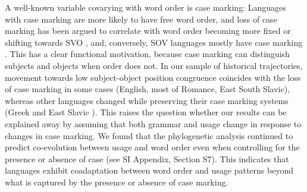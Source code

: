 \documentclass[9pt,twocolumn,twoside,lineno]{pnas-new}
\begin{document}
A well-known variable covarying with word order is case marking: Languages with case marking are more likely to have free word order, and loss of case marking has been argued to correlate with word order becoming more fixed or shifting towards SVO \citep{vennemann1974explanation}, and, conversely, SOV languages mostly have case marking \cite{greenberg-universals-1963}.
This has a clear functional motivation, because case marking can distinguish subjects and objects when order does not.
In our sample of historical trajectories, movement towards low subject-object position congruence coincides with the loss of case marking in some cases (English, most of Romance, East South Slavic), whereas other languages changed while preserving their case marking systems (Greek \citep{taylor1994change} and East Slavic \citep{matthews1960russian}).
This raises the question whether our results can be explained away by assuming that both grammar and usage change in response to changes in case marking.
We found that the phylogenetic analysis continued to predict co-evolution between usage and word order even when controlling for the presence or absence of case (see SI  Appendix, Section S7).
This indicates that languages exhibit coadaptation between word order and usage patterns beyond what is captured by the presence or absence of case marking.
\end{document}
